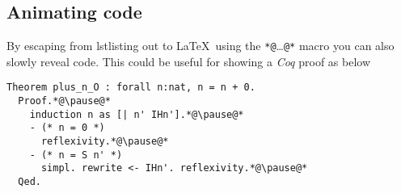 \documentclass[english, aspectratio=169]{beamer}
\begin{document}
\begin{frame}
\begin{columns}
\begin{column}{0.5\linewidth}
    \end{column}
  \end{columns}  
\end{frame}

\subsection{Animating code}
\begin{frame}[fragile]
  By escaping from lstlisting out to \LaTeX\ using the
  \texttt{*@}\dots\texttt{@*} macro you can also slowly reveal code. This could
  be useful for showing a \emph{Coq} proof as below
  \begin{lstlisting}[language=coq]
  Theorem plus_n_O : forall n:nat, n = n + 0.
  Proof.*@\pause@* 
    induction n as [| n' IHn'].*@\pause@*
    - (* n = 0 *)
      reflexivity.*@\pause@*
    - (* n = S n' *)
      simpl. rewrite <- IHn'. reflexivity.*@\pause@*
  Qed.
  \end{lstlisting}
\end{frame}

\printbibliography
\end{document}

